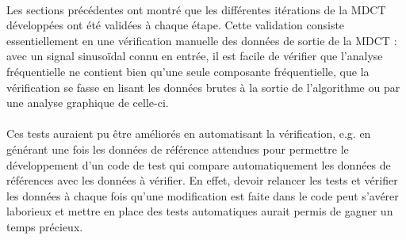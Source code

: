 \documentclass{article}
\begin{document}
    \paragraph{}
    Les sections précédentes ont montré que les différentes itérations de la MDCT développées ont été validées à chaque étape. Cette validation consiste essentiellement en une vérification manuelle des données de sortie de la MDCT : avec un signal sinusoïdal connu en entrée, il est facile de vérifier que l'analyse fréquentielle ne contient bien qu'une seule composante fréquentielle, que la vérification se fasse en lisant les données brutes à la sortie de l'algorithme ou par une analyse graphique de celle-ci.


    \paragraph{}
    Ces tests auraient pu être améliorés en automatisant la vérification, e.g. en générant une fois les données de référence attendues pour permettre le développement d'un code de test qui compare automatiquement les données de références avec les données à vérifier. En effet, devoir relancer les tests et vérifier les données à chaque fois qu'une modification est faite dans le code peut s'avérer laborieux et mettre en place des tests automatiques aurait permis de gagner un temps précieux.





\end{document}
